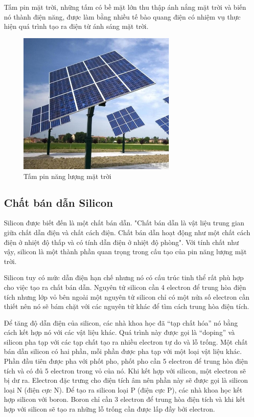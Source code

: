 Tấm pin mặt trời, những tấm có bề mặt lớn thu thập ánh nắng mặt trời và biến nó thành điện năng, được làm bằng nhiều tế bào quang điện có nhiệm vụ thực hiện quá trình tạo ra điện từ ánh sáng mặt trời.



\begin{center}
\begin{figure}[htp]
\centering    
\includegraphics[width=0.7\textwidth]{solarpanel}
\caption[Tấm pin năng lượng mặt trời]{Tấm pin năng lượng mặt trời}
\label{fig:solarpanel}
\end{figure}
\end{center}

\subsection*{Chất bán dẫn Silicon}
Silicon được biết đến là một chất bán dẫn. "Chất bán dẫn là vật liệu trung gian giữa chất dẫn điện và chất cách điện. Chất bán dẫn hoạt động như một chất cách điện ở nhiệt độ thấp và có tính dẫn điện ở nhiệt độ phòng". Với tính chất như vậy, silicon là một thành phần quan trọng trong cấu tạo của pin năng lượng mặt trời.

Silicon tuy có mức dẫn điện hạn chế nhưng nó có cấu trúc tinh thể rất phù hợp cho việc tạo ra chất bán dẫn. Nguyên tử silicon cần 4 electron để trung hòa điện tích nhưng lớp vỏ bên ngoài một nguyên tử silicon chỉ có một nửa số electron cần thiết nên nó sẽ bám chặt với các nguyên tử khác để tìm cách trung hòa điện tích.

Để tăng độ dẫn điện của silicon, các nhà khoa học đã “tạp chất hóa” nó bằng cách kết hợp nó với các vật liệu khác. Quá trình này được gọi là “doping” và silicon pha tạp với các tạp chất tạo ra nhiều electron tự do và lỗ trống. Một chất bán dẫn silicon có hai phần, mỗi phần được pha tạp với một loại vật liệu khác. Phần đầu tiên được pha với phốt pho, phốt pho cần 5 electron để trung hòa điện tích và có đủ 5 electron trong vỏ của nó. Khi kết hợp với silicon, một electron sẽ bị dư ra. Electron đặc trưng cho điện tích âm nên phần này sẽ được gọi là silicon loại N (điện cực N). Để tạo ra silicon loại P (điện cực P), các nhà khoa học kết hợp silicon với boron. Boron chỉ cần 3 electron để trung hòa điện tích và khi kết hợp với silicon sẽ tạo ra những lỗ trống cần được lấp đầy bởi electron.


